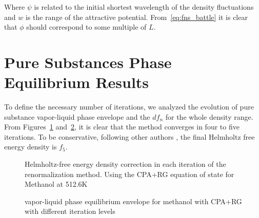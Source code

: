 \documentclass[preprint,12pt,3p]{elsarticle}
\begin{document}
    Where $\psi$ is related to the initial shortest wavelength of the density fluctuations and $w$ is the range of the attractive potential. From~\ref{eq:fns_battle} it is clear that $\phi$ should correspond to some multiple of $L$.
    
\section{Pure Substances Phase Equilibrium Results}

	To define the necessary number of iterations, we analyzed the evolution of pure substance vapor-liquid phase envelope and the $df_{n}$ for the whole density range. From Figures~\ref{fig:dfn} and~\ref{fig:PV_evol}, it is clear that the method converges in four to five iterations. To be conservative, following other authors  \cite{llovell2004thermodynamic,cai2004thermodynamics,pcm2017application}, the final Helmholtz free energy density is $f_{5}$.
	
\begin{figure}[h!]
\centering
\captionsetup{justification=centering}
\caption{Helmholtz-free energy density correction in each iteration of the renormalization method. Using the CPA+RG equation of state for Methanol at 512.6K}
\label{fig:dfn}
\end{figure}
	
\begin{figure}[h!]
\centering
\captionsetup{justification=centering}
\caption{vapor-liquid phase equilibrium envelope for methanol with CPA+RG with different iteration levels}
\label{fig:PV_evol}
\end{figure}
\end{document}
